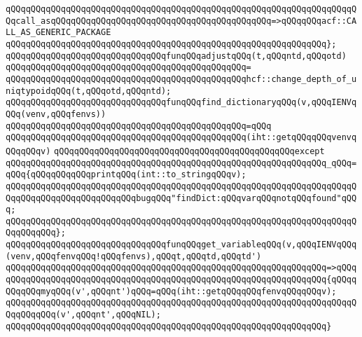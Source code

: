 \verb|qQQqqQQqqQQqqQQqqQQqqQQqqQQqqQQqqQQqqQQqqQQqqQQqqQQqqQQqqQQqqQQqqQQqqQQqcall_asqQQqqQQqqQQqqQQqqQQqqQQqqQQqqQQqqQQqqQQqqQQq=>qQQqqQQqacf::CALL_AS_GENERIC_PACKAGE|\newline
\verb|qQQqqQQqqQQqqQQqqQQqqQQqqQQqqQQqqQQqqQQqqQQqqQQqqQQqqQQqqQQqqQQq};|\newline
\newline
\verb|qQQqqQQqqQQqqQQqqQQqqQQqqQQqqQQqfunqQQqadjustqQQq(t,qQQqntd,qQQqotd)|\newline
\verb|qQQqqQQqqQQqqQQqqQQqqQQqqQQqqQQqqQQqqQQqqQQqqQQq=|\newline
\verb|qQQqqQQqqQQqqQQqqQQqqQQqqQQqqQQqqQQqqQQqqQQqqQQqhcf::change_depth_of_uniqtypoidqQQq(t,qQQqotd,qQQqntd);|\newline
\newline
\verb|qQQqqQQqqQQqqQQqqQQqqQQqqQQqqQQqfunqQQqfind_dictionaryqQQq(v,qQQqIENVqQQq(venv,qQQqfenvs))|\newline
\verb|qQQqqQQqqQQqqQQqqQQqqQQqqQQqqQQqqQQqqQQqqQQqqQQq=qQQq|\newline
\verb|qQQqqQQqqQQqqQQqqQQqqQQqqQQqqQQqqQQqqQQqqQQqqQQq(iht::getqQQqqQQqvenvqQQqqQQqv)|\newline
\verb|qQQqqQQqqQQqqQQqqQQqqQQqqQQqqQQqqQQqqQQqqQQqqQQqexcept|\newline
\verb|qQQqqQQqqQQqqQQqqQQqqQQqqQQqqQQqqQQqqQQqqQQqqQQqqQQqqQQqqQQqqQQq_qQQq=qQQq{qQQqqQQqqQQqprintqQQq(int::to_stringqQQqv);|\newline
\verb|qQQqqQQqqQQqqQQqqQQqqQQqqQQqqQQqqQQqqQQqqQQqqQQqqQQqqQQqqQQqqQQqqQQqqQQqqQQqqQQqqQQqqQQqqQQqqQQqbugqQQq"findDict:qQQqvarqQQqnotqQQqfound"qQQq;|\newline
\verb|qQQqqQQqqQQqqQQqqQQqqQQqqQQqqQQqqQQqqQQqqQQqqQQqqQQqqQQqqQQqqQQqqQQqqQQqqQQqqQQq};|\newline
\newline
\verb|qQQqqQQqqQQqqQQqqQQqqQQqqQQqqQQqfunqQQqget_variableqQQq(v,qQQqIENVqQQq(venv,qQQqfenvqQQq!qQQqfenvs),qQQqt,qQQqtd,qQQqtd')|\newline
\verb|qQQqqQQqqQQqqQQqqQQqqQQqqQQqqQQqqQQqqQQqqQQqqQQqqQQqqQQqqQQqqQQq=>qQQq|\newline
\verb|qQQqqQQqqQQqqQQqqQQqqQQqqQQqqQQqqQQqqQQqqQQqqQQqqQQqqQQqqQQqqQQq{qQQqqQQqqQQqmyqQQq(v',qQQqnt')qQQq=qQQq(iht::getqQQqqQQqfenvqQQqqQQqv);|\newline
\verb|qQQqqQQqqQQqqQQqqQQqqQQqqQQqqQQqqQQqqQQqqQQqqQQqqQQqqQQqqQQqqQQqqQQqqQQqqQQqqQQq(v',qQQqnt',qQQqNIL);|\newline
\verb|qQQqqQQqqQQqqQQqqQQqqQQqqQQqqQQqqQQqqQQqqQQqqQQqqQQqqQQqqQQqqQQq}|\newline
